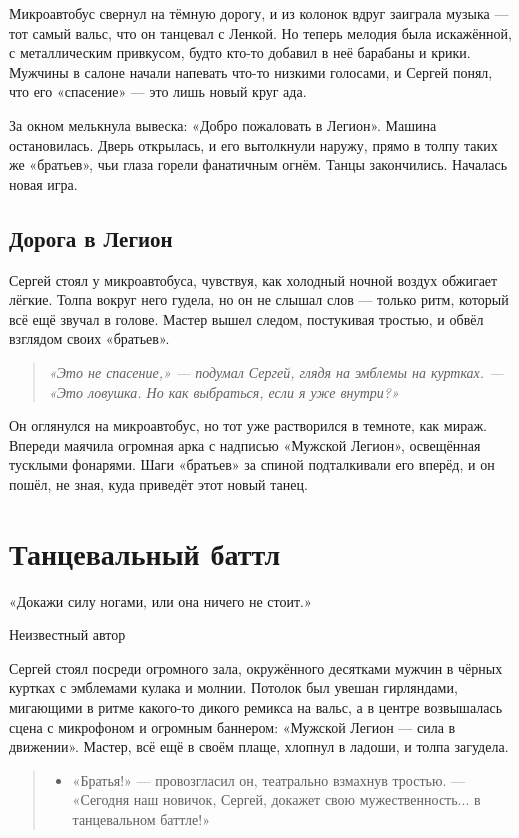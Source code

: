 \documentclass[12pt,a4paper]{book}
\newenvironment{dialogue}{\begin{quote}\itshape\begin{itemize}\item[]}{\end{itemize}\end{quote}}
\newenvironment{innerthought}{\begin{quote}\small\itshape}{\end{quote}}
\begin{document}
Микроавтобус свернул на тёмную дорогу, и из колонок вдруг заиграла музыка --- тот самый вальс, что он танцевал с Ленкой. Но теперь мелодия была искажённой, с металлическим привкусом, будто кто-то добавил в неё барабаны и крики. Мужчины в салоне начали напевать что-то низкими голосами, и Сергей понял, что его «спасение» --- это лишь новый круг ада.

За окном мелькнула вывеска: «Добро пожаловать в Легион». Машина остановилась. Дверь открылась, и его вытолкнули наружу, прямо в толпу таких же «братьев», чьи глаза горели фанатичным огнём. Танцы закончились. Началась новая игра.

\section{Дорога в Легион}

Сергей стоял у микроавтобуса, чувствуя, как холодный ночной воздух обжигает лёгкие. Толпа вокруг него гудела, но он не слышал слов --- только ритм, который всё ещё звучал в голове. Мастер вышел следом, постукивая тростью, и обвёл взглядом своих «братьев».

\begin{innerthought}
«Это не спасение,» --- подумал Сергей, глядя на эмблемы на куртках. --- «Это ловушка. Но как выбраться, если я уже внутри?»
\end{innerthought}

Он оглянулся на микроавтобус, но тот уже растворился в темноте, как мираж. Впереди маячила огромная арка с надписью «Мужской Легион», освещённая тусклыми фонарями. Шаги «братьев» за спиной подталкивали его вперёд, и он пошёл, не зная, куда приведёт этот новый танец.

\chapter{Танцевальный баттл}
\epigraph{«Докажи силу ногами, или она ничего не стоит.»}{Неизвестный автор}

Сергей стоял посреди огромного зала, окружённого десятками мужчин в чёрных куртках с эмблемами кулака и молнии. Потолок был увешан гирляндами, мигающими в ритме какого-то дикого ремикса на вальс, а в центре возвышалась сцена с микрофоном и огромным баннером: «Мужской Легион — сила в движении». Мастер, всё ещё в своём плаще, хлопнул в ладоши, и толпа загудела.

\begin{dialogue}
«Братья!» --- провозгласил он, театрально взмахнув тростью. --- «Сегодня наш новичок, Сергей, докажет свою мужественность... в танцевальном баттле!»
\end{dialogue}
\end{document}
